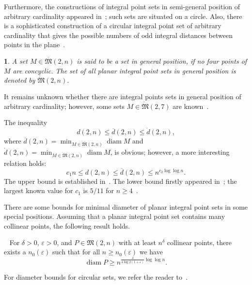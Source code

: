 \documentclass[11pt,twoside,draft
]{article}
\newtheorem{Definition}{\indent {\sc Definition}}
\begin{document}
Furthermore, the constructions of integral point sets in semi-general position of arbitrary cardinality
appeared in~\cite{harborth1993upper};
such sets are situated on a circle.
Also, there is a sophisticated construction of a circular integral point set of arbitrary cardinality
that gives the possible numbers of odd integral distances
between points in the plane~\cite{piepmeyer1996maximum}.


\begin{Definition}
	A set $M\in\overline{\mathfrak{M}}(2,n)$ is said to be a set in \textit{general position},
	if no four points of $M$ are concyclic.
	The set of all planar integral point sets in general position
	is denoted by $\dot{\mathfrak{M}}(2,n)$.
\end{Definition}

It remains unknown whether there are integral points sets in general position of arbitrary cardinality;
however, some sets $M\in \dot{\mathfrak{M}}(2,7)$ are known~\cite{kreisel2008heptagon,kurz2013constructing}.

The inequality
\begin{equation*}
	d(2,n) \leq \overline{d}(2,n) \leq \dot{d}(2,n)
	,
\end{equation*}
where
$
	\overline{d}(2,n) = \min_{M\in\overline{\mathfrak{M}}(2,n)} \operatorname{diam} M
$
and
$
	\dot{d}(2,n) = \min_{M\in\dot{\mathfrak{M}}(2,n)} \operatorname{diam} M
$,
is obvious; however, a more interesting relation holds:
\begin{equation*}
	c_1 n \leq d(2,n) \leq \overline{d}(2,n) \leq n^{c_2 \log \log n}
	.
\end{equation*}
The upper bound is established in~\cite{harborth1993upper}.
The lower bound firstly appeared in~\cite{solymosi2003note};
the largest known value for $c_1$ is $5/11$ for $n\geq 4$~\cite{my-pps-linear-bound-2019}.


There are some bounds for minimal diameter of planar integral point sets in some special positions.
Assuming that a planar integral point set contains many collinear points,
the following result holds.
\begin{Theorem}~\cite[Theorem 4]{kurz2008minimum}
	For $\delta > 0$, $\varepsilon > 0$, and $P\in\mathfrak{M}(2,n)$ with
	at least $n^\delta$ collinear points, there exists a $n_0 (\varepsilon)$
	such that for all $n \geq n_0 (\varepsilon)$ we have
	\begin{equation}
		\operatorname{diam} P \geq n^{\frac{\delta}{4 \log 2(1+\varepsilon)}\log \log n}
		.
	\end{equation}
\end{Theorem}
For diameter bounds for circular sets, we refer the reader to~\cite{bat2018number}.
\end{document}

